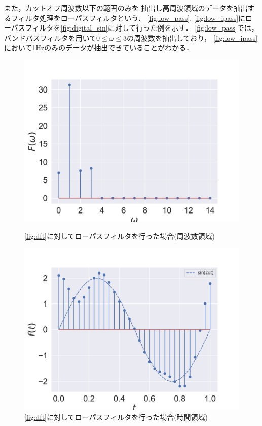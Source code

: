 また，カットオフ周波数以下の範囲のみを
抽出し高周波領域のデータを抽出するフィルタ処理をローパスフィルタという．
\autoref{fig:low_pass}, \autoref{fig:low_ipass}にローパスフィルタを\autoref{fig:digital_sin}に対して行った例を示す．
\autoref{fig:low_pass}では，バンドパスフィルタを用いて$0 \le \omega \le 3$の周波数を抽出しており，
\autoref{fig:low_ipass}において1Hzのみのデータが抽出できていることがわかる．

\iffigure
\begin{figure}[h]
    \centering
  \begin{minipage}{.45\hsize}
    \includegraphics[clip, width=\textwidth]{figure/low_pass_dft.pdf}
    \caption{\autoref{fig:dft}に対してローパスフィルタを行った場合(周波数領域)}
    \label{fig:low_pass}
  \end{minipage}
  \begin{minipage}{.45\hsize}
    \includegraphics[clip, width=\textwidth]{figure/low_pass_idft.pdf}
    \caption{\autoref{fig:dft}に対してローパスフィルタを行った場合(時間領域)}
    \label{fig:low_ipass}
  \end{minipage}
\end{figure}
\fi
